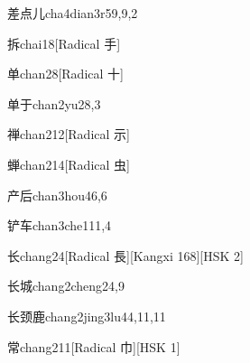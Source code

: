 \begin{entry}{差点儿}{cha4dian3r5}{9,9,2}
\end{entry}

\begin{entry}{拆}{chai1}{8}[Radical 手]
\end{entry}

\begin{entry}{单}{chan2}{8}[Radical 十]
\end{entry}

\begin{entry}{单于}{chan2yu2}{8,3}
\end{entry}

\begin{entry}{禅}{chan2}{12}[Radical 示]
\end{entry}

\begin{entry}{蝉}{chan2}{14}[Radical 虫]
\end{entry}

\begin{entry}{产后}{chan3hou4}{6,6}
\end{entry}

\begin{entry}{铲车}{chan3che1}{11,4}
\end{entry}

\begin{entry}{长}{chang2}{4}[Radical 長][Kangxi 168][HSK 2]
\end{entry}

\begin{entry}{长城}{chang2cheng2}{4,9}
\end{entry}

\begin{entry}{长颈鹿}{chang2jing3lu4}{4,11,11}
\end{entry}

\begin{entry}{常}{chang2}{11}[Radical 巾][HSK 1]
\end{entry}

